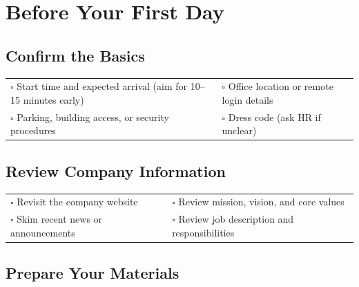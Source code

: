 
\section{Before Your First Day}
\label{sec:before}

\subsection{Confirm the Basics}

\begin{tabular}{p{9cm} p{8cm}}
$\square$ Start time and expected arrival (aim for 10–15 minutes early) & $\square$ Office location or remote login details \\ 
$\square$ Parking, building access, or security procedures & $\square$ Dress code (ask HR if unclear) \\ 
\end{tabular}

\subsection{Review Company Information}

\begin{tabular}{p{9cm} p{8cm}}
$\square$ Revisit the company website & $\square$ Review mission, vision, and core values \\ 
$\square$ Skim recent news or announcements & $\square$ Review job description and responsibilities \\ 
\end{tabular}

\subsection{Prepare Your Materials}


